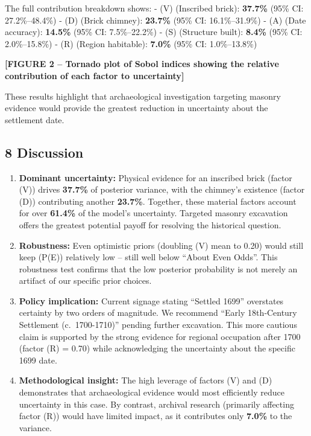 \documentclass[
  11pt,
]{article}
\begin{document}
The full contribution breakdown shows: - (V) (Inscribed brick):
\textbf{37.7\%} (95\% CI: 27.2\%--48.4\%) - (D) (Brick chimney):
\textbf{23.7\%} (95\% CI: 16.1\%--31.9\%) - (A) (Date accuracy):
\textbf{14.5\%} (95\% CI: 7.5\%--22.2\%) - (S) (Structure built):
\textbf{8.4\%} (95\% CI: 2.0\%--15.8\%) - (R) (Region habitable):
\textbf{7.0\%} (95\% CI: 1.0\%--13.8\%)

\textbf{{[}FIGURE 2 -- Tornado plot of Sobol indices showing the
relative contribution of each factor to uncertainty{]}}

These results highlight that archaeological investigation targeting
masonry evidence would provide the greatest reduction in uncertainty
about the settlement date.

\subsection{8 Discussion}\label{discussion}

\begin{enumerate}
\def\labelenumi{\arabic{enumi}.}
\item
  \textbf{Dominant uncertainty:} Physical evidence for an inscribed
  brick (factor (V)) drives \textbf{37.7\%} of posterior variance, with
  the chimney's existence (factor (D)) contributing another
  \textbf{23.7\%}. Together, these material factors account for over
  \textbf{61.4\%} of the model's uncertainty. Targeted masonry
  excavation offers the greatest potential payoff for resolving the
  historical question.
\item
  \textbf{Robustness:} Even optimistic priors (doubling (V) mean to
  0.20) would still keep (P(E)) relatively low -- still well below
  ``About Even Odds''. This robustness test confirms that the low
  posterior probability is not merely an artifact of our specific prior
  choices.
\item
  \textbf{Policy implication:} Current signage stating ``Settled 1699''
  overstates certainty by two orders of magnitude. We recommend ``Early
  18th‑Century Settlement (c.~1700-1710)'' pending further excavation.
  This more cautious claim is supported by the strong evidence for
  regional occupation after 1700 (factor (R) = 0.70) while acknowledging
  the uncertainty about the specific 1699 date.
\item
  \textbf{Methodological insight:} The high leverage of factors (V) and
  (D) demonstrates that archaeological evidence would most efficiently
  reduce uncertainty in this case. By contrast, archival research
  (primarily affecting factor (R)) would have limited impact, as it
  contributes only \textbf{7.0\%} to the variance.
\end{enumerate}
\end{document}
